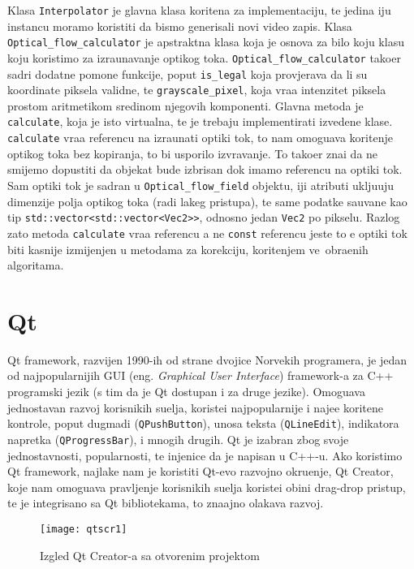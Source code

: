 Klasa \lstinline{Interpolator} je glavna klasa kori\sh tena za implementaciju, te jedina \ch iju instancu moramo koristiti da bismo generisali novi video zapis. Klasa \lstinline{Optical_flow_calculator}
je apstraktna klasa koja je osnova za bilo koju klasu koju koristimo za izra\ch unavanje opti\ch kog toka. \lstinline{Optical_flow_calculator} tako\dj er sadr\zh i dodatne pomo\cj ne funkcije, poput
\lstinline{is_legal} koja provjerava da li su koordinate piksela validne, te \lstinline{grayscale_pixel}, koja vra\cj a intenzitet piksela prostom aritmeti\ch kom sredinom njegovih komponenti.
Glavna metoda je \lstinline{calculate}, koja je \ch isto virtualna, te je trebaju implementirati izvedene klase. \lstinline{calculate} vra\cj a referencu na izra\ch unati opti\ch ki tok, \sh to nam omogu\cj ava
kori\sh tenje opti\ch kog toka bez kopiranja, \sh to bi usporilo izvr\sh avanje. To tako\dj er zna\ch i da ne smijemo dopustiti da objekat bude izbrisan dok imamo referencu na opti\ch ki tok.
Sam opti\ch ki tok je sadr\zh an u \lstinline{Optical_flow_field} objektu, \ch iji atributi uklju\ch uju dimenzije polja opti\ch kog toka (radi lak\sh eg pristupa), te same podatke sa\ch uvane kao tip
\lstinline{std::vector<std::vector<Vec2>>}, odnosno jedan \lstinline{Vec2} po pikselu. Razlog za\sh to metoda \lstinline{calculate} vra\cj a referencu a ne \lstinline{const} referencu jeste \sh to \cj e
opti\ch ki tok biti kasnije izmijenjen u metodama za korekciju, kori\sh tenjem ve\cj\ obra\dj enih algoritama.

\section{Qt} %
Qt framework, razvijen 1990-ih od strane dvojice Norve\sh kih programera, je jedan od najpopularnijih GUI (eng. \textit{Graphical User Interface}) framework-a za C++ programski jezik (s tim da je
Qt dostupan i za druge jezike). Omogu\cj ava jednostavan razvoj korisni\ch kih su\ch elja, koriste\cj i najpopularnije i naj\ch e\sh \cj e kori\sh tene kontrole, poput dugmadi (\lstinline{QPushButton}),
unosa teksta (\lstinline{QLineEdit}), indikatora napretka (\lstinline{QProgressBar}), i mnogih drugih. Qt je izabran zbog svoje jednostavnosti, popularnosti, te \ch injenice da je napisan u C++-u.
Ako koristimo Qt framework, najlak\sh e nam je koristiti Qt-evo razvojno okru\zh enje, Qt Creator, koje nam omogu\cj ava pravljenje korisni\ch kih su\ch elja koriste\cj i obi\ch ni drag-drop pristup,
te je integrisano sa Qt bibliotekama, \sh to zna\ch ajno olak\sh ava razvoj\cite{qtabout}.
\begin{figure}[H]
\caption{Izgled Qt Creator-a sa otvorenim projektom}
\texttt{[image: qtscr1]}
\centering
\end{figure}

